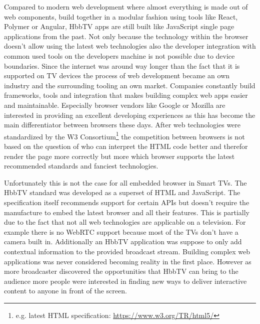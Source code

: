 Compared to modern web development where almost everything is made out of web components, build together in a
modular fashion using tools like React, Polymer or Angular, HbbTV apps are still built like JavaScript single
page applications from the past. Not only because the technology within the browser doesn't allow using the
latest web technologies also the developer integration with common used tools on the developers machine is not
possible due to device boundaries. Since the internet was around way longer than the fact that it is supported on
TV devices the process of web development became an own industry and the surrounding tooling an own market.
Companies constantly build frameworks, tools and integration that makes building complex web apps easier and
maintainable. Especially browser vendors like Google or Mozilla are interested in providing an excellent
developing experiences as this has become the main differentiator between browsers these days. After web
technologies were standardized by the W3 Consortium\footnote{e.g. latest HTML specification: \url{https://www.w3.org/TR/html5/}}
the competition between browsers is not based on the question of who can interpret the HTML code better and therefor
render the page more correctly but more which browser supports the latest recommended standards and fanciest
technologies.

Unfortunately this is not the case for all embedded browser in Smart TVs. The HbbTV standard was developed as
a superset of HTML and JavaScript. The specification itself recommends support for certain APIs but doesn't
require the manufacture to embed the latest browser and all their features. This is partially due to the fact
that not all web technologies are applicable on a television. For example there is no WebRTC support because
most of the TVs don't have a camera built in. Additionally an HbbTV application was suppose to only add contextual
information to the provided broadcast stream. Building complex web applications was never considered becoming
reality in the first place. However as more broadcaster discovered the opportunities that HbbTV can bring to
the audience more people were interested in finding new ways to deliver interactive content to anyone in
front of the screen.

